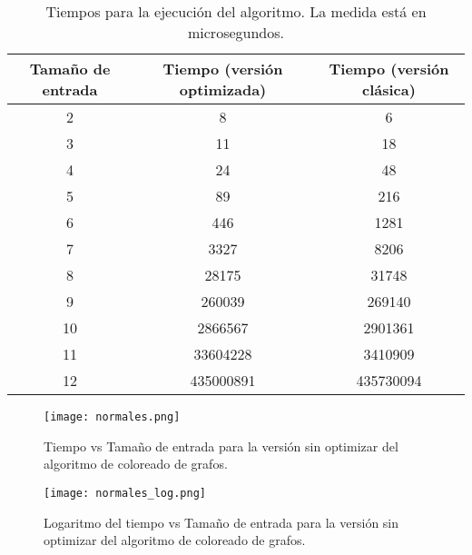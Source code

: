\documentclass[british,a4paper,11pt,titlepage]{article}
\begin{document}
    \begin{table}[p]
        \centering
        \begin{tabular}{ccc}
            \hline

            Tamaño de entrada & Tiempo (versión optimizada) & Tiempo (versión clásica) \\ \hline
            2   &   8           & 6             \\
            3   &   11          & 18            \\
            4   &   24          & 48            \\
            5   &   89          & 216           \\
            6   &   446         & 1281          \\
            7   &   3327        & 8206          \\
            8   &   28175       & 31748         \\
            9   &   260039      & 269140        \\
            10  &   2866567     & 2901361       \\
            11  &   33604228    & 3410909       \\
            12  &   435000891   & 435730094     \\ \hline
        \end{tabular}
        \caption{Tiempos para la ejecución del algoritmo. La medida está en microsegundos.}
        \label{tab:tabla_resultados}
    \end{table}

    \begin{figure}[p]
        \centering
        \texttt{[image: normales.png]}%
        \hspace{0.1\linewidth}%
        \caption[]{Tiempo vs Tamaño de entrada para la versión sin optimizar del algoritmo de coloreado de grafos.}
        \label{fig:res_normales}
    \end{figure}

    \begin{figure}[p]
        \centering
        \texttt{[image: normales\_log.png]}%
        \hspace{0.1\linewidth}%
        \caption[]{Logaritmo del tiempo vs Tamaño de entrada para la versión sin optimizar del algoritmo de coloreado de grafos.}
        \label{fig:res_normales_log}
    \end{figure}
\end{document}
